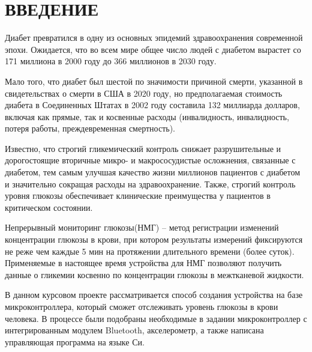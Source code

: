 \begin{sloppypar} %
\newpage %
\section*{ВВЕДЕНИЕ} %
Диабет превратился в одну из основных эпидемий здравоохранения современной эпохи. Ожидается, что во всем мире общее число людей с диабетом вырастет со 171 миллиона в 2000 году до 366 миллионов в 2030 году.\cite{ADXL}

Мало того, что диабет был шестой по значимости причиной смерти, указанной в свидетельствах о смерти в США в 2020 году, но предполагаемая стоимость диабета в Соединенных Штатах в 2002 году составила 132 миллиарда долларов, включая как прямые, так и косвенные расходы (инвалидность, инвалидность, потеря работы, преждевременная смертность).

Известно, что строгий гликемический контроль снижает разрушительные и дорогостоящие вторичные микро- и макрососудистые осложнения, связанные с диабетом, тем самым улучшая качество жизни миллионов пациентов с диабетом и значительно сокращая расходы на здравоохранение. Также, строгий контроль уровня глюкозы обеспечивает клинические преимущества у пациентов в критическом состоянии.


Непрерывный мониторинг глюкозы(НМГ) -- метод регистрации изменений концентрации глюкозы в крови, при котором результаты измерений фиксируются не реже чем каждые 5 мин на протяжении длительного времени (более суток). Применяемые в настоящее время устройства для НМГ позволяют получить данные о гликемии косвенно по концентрации глюкозы в межтканевой жидкости.

В данном курсовом проекте  рассматривается способ создания устройства на базе микроконтроллера, который сможет отслеживать уровень глюкозы в крови человека.  В процессе были подобраны необходимые в задании микроконтроллер с интегрированным модулем Bluetooth, акселерометр, а также написана управляющая программа на языке Си. 



\end{sloppypar}
